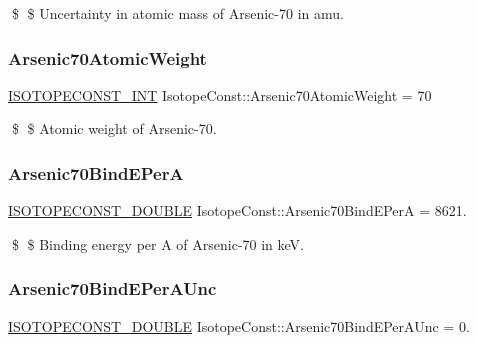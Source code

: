 \$ \$ Uncertainty in atomic mass of Arsenic-\/70 in amu. \mbox{\label{group___isotope_const-_arsenic-_as70_gabdf1ceec1af2c0ea462f6aa8861bd753}} 
\subsubsection{\texorpdfstring{Arsenic70\+Atomic\+Weight}{Arsenic70AtomicWeight}}
{\footnotesize\ttfamily \mbox{\hyperlink{group___isotope_const-_macros_ga5f18360b3e99483a35c32d789e62621c}{I\+S\+O\+T\+O\+P\+E\+C\+O\+N\+S\+T\+\_\+\+I\+NT}} Isotope\+Const\+::\+Arsenic70\+Atomic\+Weight = 70}

\$ \$ Atomic weight of Arsenic-\/70. \mbox{\label{group___isotope_const-_arsenic-_as70_gac47bc6988570f8fc995828115c10a504}} 
\subsubsection{\texorpdfstring{Arsenic70\+Bind\+E\+PerA}{Arsenic70BindEPerA}}
{\footnotesize\ttfamily \mbox{\hyperlink{group___isotope_const-_macros_ga8f45a7272ce02c0b4c65c44636ed719a}{I\+S\+O\+T\+O\+P\+E\+C\+O\+N\+S\+T\+\_\+\+D\+O\+U\+B\+LE}} Isotope\+Const\+::\+Arsenic70\+Bind\+E\+PerA = 8621.}

\$ \$ Binding energy per A of Arsenic-\/70 in keV. \mbox{\label{group___isotope_const-_arsenic-_as70_ga22b1c586376bef0224d5228bd06f7028}} 
\subsubsection{\texorpdfstring{Arsenic70\+Bind\+E\+Per\+A\+Unc}{Arsenic70BindEPerAUnc}}
{\footnotesize\ttfamily \mbox{\hyperlink{group___isotope_const-_macros_ga8f45a7272ce02c0b4c65c44636ed719a}{I\+S\+O\+T\+O\+P\+E\+C\+O\+N\+S\+T\+\_\+\+D\+O\+U\+B\+LE}} Isotope\+Const\+::\+Arsenic70\+Bind\+E\+Per\+A\+Unc = 0.}

